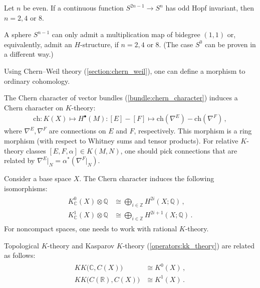      \begin{theorem}
         Let $n$ be even. If a continuous function $S^{2n-1}\rightarrow S^n$ has odd Hopf invariant, then $n=2,4$ or 8.
     \end{theorem}
     \begin{result}
         A sphere $S^{n-1}$ can only admit a multiplication map of bidegree $(1,1)$ or, equivalently, admit an $H$-structure, if $n=2,4$ or 8. (The case $S^0$ can be proven in a different way.)
     \end{result}

    Using Chern--Weil theory (\cref{section:chern_weil}), one can define a morphism to ordinary cohomology.
    \begin{construct}\label{k:chern_character}
        The Chern character of vector bundles (\cref{bundle:chern_character}) induces a Chern character on $K$-theory:
        \begin{gather}
            \mathrm{ch}:K(X)\mapsto H^\bullet(M):[E]-[F]\mapsto \mathrm{ch}(\nabla^E)-\mathrm{ch}(\nabla^F)\,,
        \end{gather}
        where $\nabla^E,\nabla^F$ are connections on $E$ and $F$, respectively. This morphism is a ring morphism (with respect to Whitney sums and tensor products). For relative $K$-theory classes $[E,F,\alpha]\in K(M,N)$, one should pick connections that are related by $\nabla^E|_N=\alpha^*(\nabla^F|_N)$.
    \end{construct}
    \begin{theorem}
        Consider a base space $X$. The Chern character induces the following isomorphisms:
        \begin{gather}
            \begin{aligned}
                K^0_{\mathbb{C}}(X)\otimes\mathbb{Q}&\cong\bigoplus_{i\in\mathbb{Z}}H^{2i}(X;\mathbb{Q})\,,\\
                K^1_{\mathbb{C}}(X)\otimes\mathbb{Q}&\cong\bigoplus_{i\in\mathbb{Z}}H^{2i+1}(X;\mathbb{Q})\,.
            \end{aligned}
        \end{gather}
        For noncompact spaces, one needs to work with rational $K$-theory.
    \end{theorem}

    \begin{property}[$K\!K$-theory]\label{k:topological_kk_theory}
        Topological $K$-theory and Kasparov $K$-theory (\cref{operators:kk_theory}) are related as follows:
        \begin{gather}
            \begin{aligned}
                K\!K\bigl(\mathbb{C},C(X)\bigr)&\cong K^0(X)\,,\\
                K\!K\bigl(C(\mathbb{R}),C(X)\bigr)&\cong K^1(X)\,.
            \end{aligned}
        \end{gather}
    \end{property}

